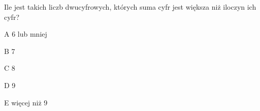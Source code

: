 \begin{tresc}
Ile jest takich liczb dwucyfrowych, których suma cyfr jest większa niż iloczyn ich cyfr?
\end{tresc}
\begin{wariant}{A} 6 lub mniej \end{wariant}
\begin{wariant}{B} 7 \end{wariant}
\begin{wariant}{C} 8 \end{wariant}
\begin{wariant}{D} 9 \end{wariant}
\begin{wariant}{E} więcej niż 9 \end{wariant}
